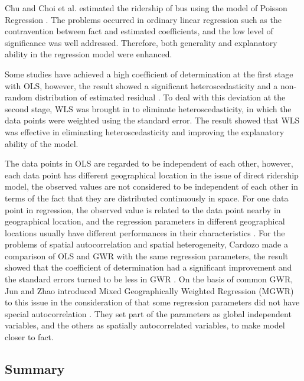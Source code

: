 \documentclass[utf8]{article}
\begin{document}
%
Chu and Choi et al. estimated the ridership of bus using the model of Poisson Regression \cite{Choi2012,Chu2004}. The problems occurred in ordinary linear regression such as the contravention between fact and estimated coefficients, and the low level of significance was well addressed. Therefore, both generality and explanatory ability in the regression model were enhanced.

%
Some studies have achieved a high coefficient of determination at the first stage with OLS, however, the result showed a significant heteroscedasticity and a non-random distribution of estimated residual \cite{Kuby2004}. To deal with this deviation at the second stage, WLS was brought in to eliminate heteroscedasticity, in which the data points were weighted using the standard error. The result showed that WLS was effective in eliminating heteroscedasticity and improving the explanatory ability of the model.

%
The data points in OLS are regarded to be independent of each other, however, each data point has different geographical location in the issue of direct ridership model, the observed values are not considered to be independent of each other in terms of the fact that they are distributed continuously in space. For one data point in regression, the observed value is related to the data point nearby in geographical location, and the regression parameters in different geographical locations usually have different performances in their characteristics \cite{Fotheringham2002}. For the problems of spatial autocorrelation and spatial heterogeneity, Cardozo made a comparison of OLS and GWR with the same regression parameters, the result showed that the coefficient of determination had a significant improvement and the standard errors turned to be less in GWR \cite{Cardozo2012}. On the basis of common GWR, Jun and Zhao introduced Mixed Geographically Weighted Regression (MGWR) to this issue in the consideration of that some regression parameters did not have special autocorrelation \cite{Jun2015,Zhao2005}. They set part of the parameters as global independent variables, and the others as spatially autocorrelated variables, to make model closer to fact.

%
\subsection{Summary}
\indent
\end{document}
